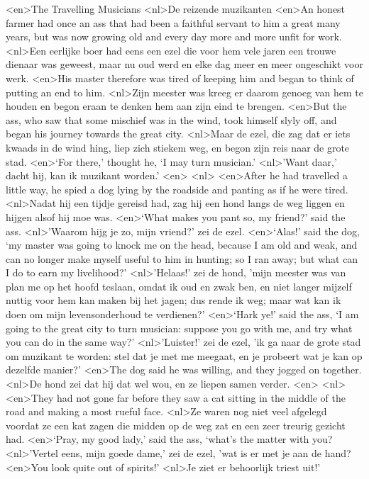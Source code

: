 <en>The Travelling Musicians
<nl>De reizende muzikanten
<en>An honest farmer had once an ass that had been a faithful servant to him a great many years, but was now growing old and every day more and more unfit for work.
<nl>Een eerlijke boer had eens een ezel die voor hem vele jaren een trouwe dienaar was geweest, maar nu  oud werd en elke dag meer en meer ongeschikt voor werk.
<en>His master therefore was tired of keeping him and began to think of putting an end to him.
<nl>Zijn meester was kreeg er daarom genoeg van hem te houden en begon eraan te denken  hem aan zijn eind te brengen.
<en>But the ass, who saw that some mischief was in the wind, took himself slyly off, and began his journey towards the great city.
<nl>Maar de ezel, die zag dat er iets kwaads in de wind hing, liep zich stiekem  weg, en begon zijn reis naar de grote stad.
<en>‘For there,’ thought he, ‘I may turn musician.’
<nl>'Want daar,' dacht hij, kan ik muzikant worden.'
<en>
<nl>
<en>After he had travelled a little way, he spied a dog lying by the roadside and panting as if he were tired.
<nl>Nadat hij een tijdje gereisd had, zag hij een hond langs de weg liggen en hijgen alsof hij moe was.
<en>‘What makes you pant so, my friend?’ said the ass.
<nl>'Waarom hijg je zo, mijn vriend?' zei de ezel.
<en>‘Alas!’ said the dog, ‘my master was going to knock me on the head, because I am old and weak, and can no longer make myself useful to him in hunting; so I ran away; but what can I do to earn my livelihood?’
<nl>'Helaas!' zei de hond, 'mijn meester was van plan me op het hoofd teslaan, omdat ik oud en zwak ben, en niet langer mijzelf nuttig voor hem kan maken  bij het jagen; dus rende ik weg; maar wat kan ik doen om mijn levensonderhoud te verdienen?'
<en>‘Hark ye!’ said the ass, ‘I am going to the great city to turn musician: suppose you go with me, and try what you can do in the same way?’
<nl>'Luister!' zei de ezel, 'ik ga naar de grote stad om muzikant te worden: stel dat je met me meegaat, en je probeert wat je kan op dezelfde manier?'
<en>The dog said he was willing, and they jogged on together.
<nl>De hond zei dat hij dat wel wou, en ze liepen samen verder.
<en>
<nl>
<en>They had not gone far before they saw a cat sitting in the middle of the road and making a most rueful face.
<nl>Ze waren nog niet veel afgelegd voordat ze een kat zagen die midden op de weg zat en een zeer treurig gezicht had.
<en>‘Pray, my good lady,’ said the ass, ‘what’s the matter with you?
<nl>'Vertel eens, mijn goede dame,' zei de ezel, 'wat is er met je aan de hand?
<en>You look quite out of spirits!’
<nl>Je ziet er behoorlijk triest uit!'
